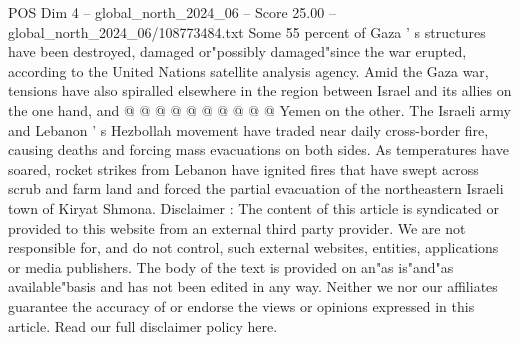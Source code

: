 \begin{textsample}{POS Dim 4 – global\_north\_2024\_06 – Score 25.00 – global\_north\_2024\_06/108773484.txt}
Some 55 percent of Gaza ' s structures have been destroyed, damaged or"possibly damaged"since the war erupted, according to the United Nations satellite analysis agency.
Amid the Gaza war, tensions have also spiralled elsewhere in the region between Israel and its allies on the one hand, and @ @ @ @ @ @ @ @ @ @ Yemen on the other.
The Israeli army and Lebanon ' s Hezbollah movement have traded near daily cross-border fire, causing deaths and forcing mass evacuations on both sides.
As temperatures have soared, rocket strikes from Lebanon have ignited fires that have swept across scrub and farm land and forced the partial evacuation of the northeastern Israeli town of Kiryat Shmona.
Disclaimer : The content of this article is syndicated or provided to this website from an external third party provider.
We are not responsible for, and do not control, such external websites, entities, applications or media publishers.
The body of the text is provided on an"as is"and"as available"basis and has not been edited in any way.
Neither we nor our affiliates guarantee the accuracy of or endorse the views or opinions expressed in this article.
Read our full disclaimer policy here.

\end{textsample}
